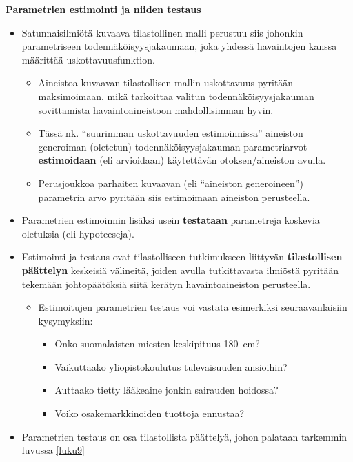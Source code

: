 \documentclass[
]{book}
\providecommand{\tightlist}{%
  \setlength{\itemsep}{0pt}\setlength{\parskip}{0pt}}
\begin{document}
\hfill\break

\textbf{Parametrien estimointi ja niiden testaus}

\begin{itemize}
\tightlist
\item
  Satunnaisilmiötä kuvaava tilastollinen malli perustuu siis johonkin parametriseen todennäköisyysjakaumaan, joka yhdessä havaintojen kanssa määrittää uskottavuusfunktion.

  \begin{itemize}
  \tightlist
  \item
    Aineistoa kuvaavan tilastollisen mallin uskottavuus pyritään maksimoimaan, mikä tarkoittaa valitun todennäköisyysjakauman sovittamista havaintoaineistoon mahdollisimman hyvin.
  \item
    Tässä nk. ``suurimman uskottavuuden estimoinnissa'' aineiston generoiman (oletetun) todennäköisyysjakauman parametriarvot \textbf{estimoidaan} (eli arvioidaan) käytettävän otoksen/aineiston avulla.
  \item
    Perusjoukkoa parhaiten kuvaavan (eli ``aineiston generoineen'') parametrin arvo pyritään siis estimoimaan aineiston perusteella.
  \end{itemize}
\item
  Parametrien estimoinnin lisäksi usein \textbf{testataan} parametreja koskevia oletuksia (eli hypoteeseja).
\item
  Estimointi ja testaus ovat tilastolliseen tutkimukseen liittyvän \textbf{tilastollisen päättelyn} keskeisiä välineitä, joiden avulla tutkittavasta ilmiöstä pyritään tekemään johtopäätöksiä siitä kerätyn havaintoaineiston perusteella.

  \begin{itemize}
  \tightlist
  \item
    Estimoitujen parametrien testaus voi vastata esimerkiksi seuraavanlaisiin kysymyksiin:

    \begin{itemize}
    \tightlist
    \item
      Onko suomalaisten miesten keskipituus 180~cm?
    \item
      Vaikuttaako yliopistokoulutus tulevaisuuden ansioihin?
    \item
      Auttaako tietty lääkeaine jonkin sairauden hoidossa?
    \item
      Voiko osakemarkkinoiden tuottoja ennustaa?
    \end{itemize}
  \end{itemize}
\item
  Parametrien testaus on osa tilastollista päättelyä, johon palataan tarkemmin luvussa \ref{luku9}
\end{itemize}
\end{document}
